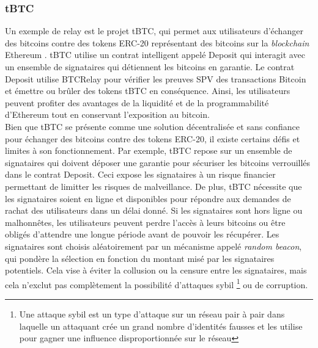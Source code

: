 \subsubsection{tBTC}
Un exemple de relay est le projet tBTC, qui permet aux utilisateurs d’échanger des bitcoins contre des 
tokens ERC-20 représentant des bitcoins sur la \textit{\gls{blockchain}} Ethereum \cite{hildebrandt2020tokenization,lan2021horizon}. tBTC utilise un contrat intelligent 
appelé Deposit qui interagit avec un ensemble de signataires qui détiennent les bitcoins en garantie. 
Le contrat Deposit utilise BTCRelay pour vérifier les preuves SPV des transactions Bitcoin et émettre ou 
brûler des tokens tBTC en conséquence. Ainsi, les utilisateurs peuvent profiter des avantages de la liquidité 
et de la programmabilité d’Ethereum tout en conservant l’exposition au bitcoin. \\
Bien que tBTC se présente comme une solution décentralisée et sans confiance pour échanger des bitcoins contre 
des tokens ERC-20, il existe certains défis et limites à son fonctionnement. 
Par exemple, tBTC repose sur un ensemble de signataires qui doivent déposer une garantie pour sécuriser les bitcoins
verrouillés dans le contrat Deposit. Ceci expose les signataires à un risque financier permettant de limitter les risques de malveillance. 
De plus, tBTC nécessite que les signataires soient en ligne et disponibles pour répondre aux demandes de rachat des 
utilisateurs dans un délai donné. Si les signataires sont hors ligne ou malhonnêtes, les utilisateurs peuvent 
perdre l’accès à leurs bitcoins ou être obligés d’attendre une longue période avant de pouvoir les récupérer. 
Les signataires sont choisis aléatoirement par un mécanisme appelé \textit{random beacon}, qui pondère la sélection en 
fonction du montant misé par les signataires potentiels. Cela vise à éviter la collusion ou la censure entre les 
signataires, mais cela n’exclut pas complètement la possibilité d’attaques sybil \footnote{Une attaque sybil est 
un type d’attaque sur un réseau pair à pair dans laquelle un attaquant crée un grand nombre d’identités fausses 
et les utilise pour gagner une influence disproportionnée sur le réseau} ou de corruption.